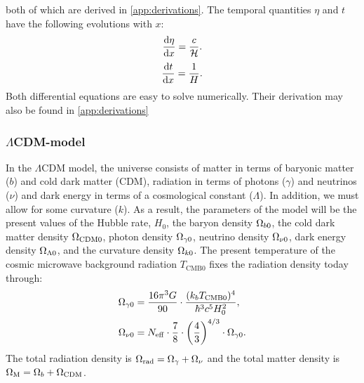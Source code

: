     both of which are derived in \cref{app:derivations}. The temporal quantities $\eta$ and $t$ have the following evolutions with $x$:
    \begin{equation}\label{eq:m1:theory:measures:eta_diffeq}
        \dv{\eta}{x} = \frac{c}{\mathcal{H}}.
    \end{equation}
    \begin{equation}\label{eq:m1:theory:measures:t_diffeq}
        \dv{t}{x} = \frac{1}{H}.
    \end{equation}
    Both differential equations are easy to solve numerically. Their derivation may also be found in \cref{app:derivations}

\subsubsection{$\Lambda$CDM-model}

    In the $\Lambda$CDM model, the universe consists of matter in terms of baryonic matter ($b$) and cold dark matter (CDM), radiation in terms of photons ($\gamma$) and neutrinos ($\nu$) and dark energy in terms of a cosmological constant ($\Lambda$). In addition, we must allow for some curvature ($k$). As a result, the parameters of the model will be the present values of the Hubble rate, $H_0$, the baryon density $\Omega_{b0}$, the cold dark matter density $\Omega_{\mathrm{CDM}0}$, photon density $\Omega_{\gamma0}$, neutrino density $\Omega_{\nu0}$, dark energy density $\Omega_{\Lambda0}$, and the curvature density $\Omega_{k0}$. The present temperature of the cosmic microwave background radiation $T_{\mathrm{CMB}0}$ fixes the radiation density today through:
    \begin{equation}\label{eq:m1:theory:lambdaCDM:radiation_densities}
        \begin{split}
            \Omega_{\gamma0} &= \frac{16\pi^3G}{90}\cdot\frac{(k_b T_{\mathrm{CMB}0})^4}{\hbar^3c^5H_0^2}, \\
            \Omega_{\nu0} &= N_\mathrm{eff} \cdot\frac{7}{8} \cdot \left( \frac{4}{3} \right)^{4/3}\cdot \Omega_{\gamma0}.
        \end{split}
    \end{equation}
    The total radiation density is $\Omega_\mathrm{rad}=\Omega_\gamma+\Omega_\nu$ and the total matter density is $\Omega_\mathrm{M} = \Omega_b+\Omega_\mathrm{CDM}$.


